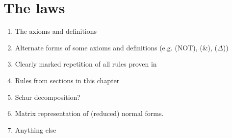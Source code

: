 \section{The laws}

\begin{TODOLIST}
\begin{enumerate}
\item The axioms and definitions
\item Alternate forms of some axioms and definitions (e.g. (NOT), (\&),
($\Delta$))
\item Clearly marked repetition of all rules proven in
\cite{backens2018zhcalculus}
\item Rules from sections in this chapter
\item Schur decomposition?
\item Matrix representation of (reduced) normal forms.
\item Anything else
\end{enumerate}
\end{TODOLIST}
